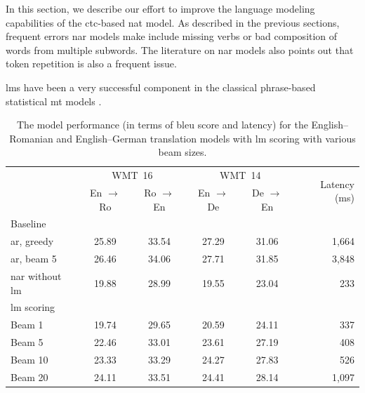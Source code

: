 \noindent
In this section, we describe our effort to improve the language modeling
capabilities of the \acs{ctc}-based \ac{nat} model. As described in the
previous sections, frequent errors \acl{nar} models make include missing verbs
or bad composition of words from multiple subwords. The literature on \ac{nar}
models also points out that token repetition is also a frequent issue. 

\Acp{lm} have been a very successful component in the classical phrase-based
statistical \acs{mt} models \citep{koehn2009statistical}.


\begin{table}
  \centering

  \begin{tabular}{lccccr}
    \toprule
    & \multicolumn{2}{c}{WMT~16}
    & \multicolumn{2}{c}{WMT~14}
    & \multirow{2}{*}{Latency (ms)} \\
    & En $\rightarrow$ Ro & Ro $\rightarrow$ En
    & En $\rightarrow$ De & De $\rightarrow$ En  & \\
    \midrule
    Baseline & & & & & \\
    \acs{ar}, greedy & 25.89 & 33.54 & 27.29 &  31.06 & 1,664 \\
    \acs{ar}, beam 5 & 26.46 & 34.06 & 27.71 & 31.85 & 3,848 \\
    \acs{nar} without \acs{lm} & 19.88 & 28.99 & 19.55 & 23.04 & 233 \\
    \addlinespace
    \acs{lm} scoring & & & & & \\
    Beam 1 & 19.74 & 29.65 & 20.59 & 24.11 &  337 \\
    Beam 5 & 22.46 & 33.01 & 23.61 & 27.19 & 408  \\
    Beam 10 & 23.33 & 33.29 & 24.27 & 27.83 & 526 \\
    Beam 20 & 24.11 & 33.51 & 24.41 & 28.14 & 1,097 \\
    \bottomrule
  \end{tabular}

  \caption{The model performance (in terms of \acs{bleu} score and latency) for
    the English--Romanian and English--German translation models with \acs{lm}
    scoring with various beam sizes.}%
  \label{tab:ngrams:bleu}
\end{table}


